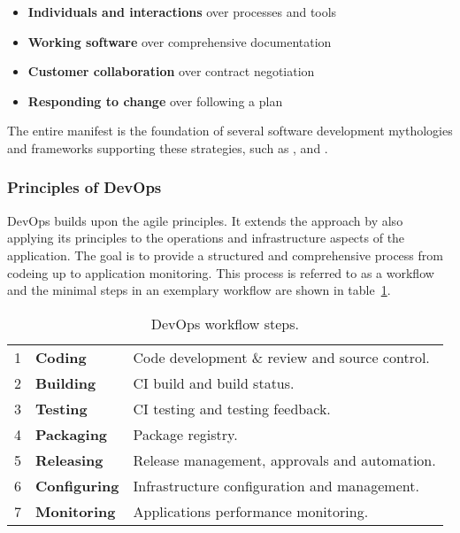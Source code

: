 \documentclass[12pt, a4paper]{article}
\begin{document}
        \begin{itemize}[label=\(\star\)]
            \setlength\itemsep{0em}
            \item \textbf{Individuals and interactions} over processes and tools
            \item \textbf{Working software} over comprehensive documentation
            \item \textbf{Customer collaboration} over contract negotiation
            \item \textbf{Responding to change} over following a plan
        \end{itemize}

        \noindent The entire manifest is the foundation of several software development mythologies and frameworks supporting these strategies, such as ,  and .
        \subsubsection{Principles of DevOps}
        DevOps builds upon the agile principles. It extends the  approach by also applying its principles to the operations and infrastructure aspects of the application. The goal is to provide a structured and comprehensive process from codeing up to application monitoring. This process is referred to as a workflow and the minimal steps in an exemplary workflow are shown in table~\ref{tab::devops_steps}.\newline
        \begin{table}[!h]
            \centering
            \begin{tabularx}{0.85\textwidth}{llX}
            1 & \textbf{Coding}& Code development \& review and source control.  \\
            2 & \textbf{Building}& \acs{CI} build and build status.  \\
            3 & \textbf{Testing}& \acs{CI} testing and testing feedback.  \\
            4 & \textbf{Packaging}& Package registry.  \\
            5 & \textbf{Releasing}& Release management, approvals and automation.  \\
            6 & \textbf{Configuring}& Infrastructure configuration and management.  \\
            7 & \textbf{Monitoring}& Applications performance monitoring.  \\
            \end{tabularx}
            \caption{DevOps workflow steps.}
            \label{tab::devops_steps}
        \end{table}
\end{document}
